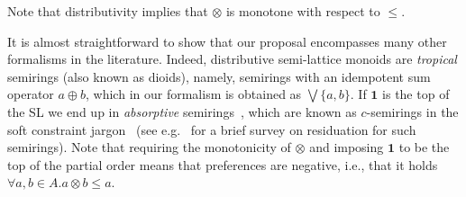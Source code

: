 \documentclass{llncs}
\def\monid{{\mathbf 0}}
\def\monop{\otimes}
\def\monid{\mathbf{1}}
\begin{document}
Note that distributivity implies that $\otimes$ is monotone with respect to $\leq$.
\begin{remark}

	It is almost straightforward to show that our proposal encompasses many other formalisms in the literature.
	Indeed, distributive semi-lattice monoids are \emph{tropical} semirings (also known as dioids), 
	namely, semirings with an idempotent sum operator $a \oplus b$, which in our formalism is obtained as
	$\bigvee \{a, b\}$.
	If $\monid$ is the top of the SL we end up 
	in \emph{absorptive} semirings~\cite{golanShort}, 
	which are known as $c$-semirings 
	in the soft constraint jargon~\cite{jacm97} (see e.g.~\cite{ecai06} for a brief survey on residuation 
	for such semirings).
	Note that requiring the monotonicity of $\otimes$ and imposing $\monid$ to be the top of the partial order
	means that preferences are negative, i.e., 
	that it holds $\forall a, b \in A. a \monop b \leq a$.
\end{remark}

%
%
%
\end{document}
